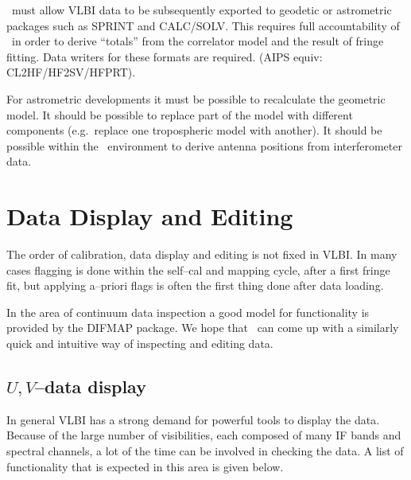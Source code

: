 \aipspp\ must allow VLBI data to be subsequently
exported to geodetic or astrometric packages such as SPRINT and
CALC\slash SOLV. This requires full accountability of \aipspp\ in
order to derive ``totals'' from the correlator model and the result 
of fringe fitting. Data writers for these formats are required. (AIPS
equiv: CL2HF\slash HF2SV\slash HFPRT).  

For astrometric developments it must be possible to recalculate the
geometric model. It should be possible to replace part of the model
with different components (e.g.\ replace one tropospheric model with
another). It should be possible within the \aipspp\ environment to
derive antenna positions from interferometer data.

\section{Data Display and Editing}

The order of calibration, data display and editing is not fixed in
VLBI.  In many cases flagging is done within the self--cal and mapping
cycle, after a first fringe fit, but applying a--priori flags is often
the first thing done after data loading.

In the area of continuum data inspection a good model for
functionality is provided by the DIFMAP package. We hope that \aipspp\
can come up with a similarly  quick and intuitive way of inspecting and
editing data.

\subsection{$U,\! V$--data display}

In general VLBI has a strong demand for powerful tools to display the
data. Because of the large number of visibilities, each composed of
many IF bands and spectral channels, a lot of the time can be involved
in checking the data. A list of functionality that is expected in
this area is given below.

